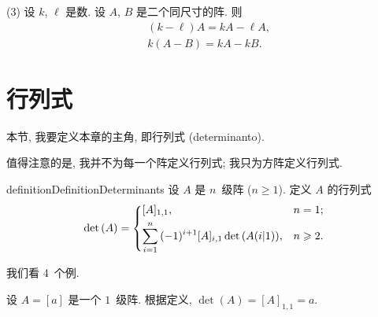 (3)
设 \(k\), \(\ell\) 是数.
设 \(A\), \(B\) 是二个同尺寸的阵.
则
\begin{align*}
     & (k - \ell) A = kA - \ell A, \\
     & k(A - B) = kA - kB.
\end{align*}

\section{行列式}

本节, 我要定义本章的主角, 即行列式
(determinanto).

值得注意的是, 我并不为每一个阵定义行列式;
我只为方阵定义行列式.

\begin{restatable}[行列式]{definition}{DefinitionDeterminants}
    设 \(A\) 是 \(n\)~级阵 (\(n \geq 1\)).
    定义 \(A\) 的行列式
    \begin{align*}
        \det {(A)}
        =
        \begin{dcases}
            [A]_{1,1},
             & n = 1;    \\
            \sum_{i = 1}^{n}
            {(-1)^{i+1} [A]_{i,1} \det {(A(i|1))}},
             & n \geq 2.
        \end{dcases}
    \end{align*}
\end{restatable}

我们看 4~个例.

\begin{example}
    设 \(A = [a]\) 是一个 \(1\)~级阵.
    根据定义, \(\det {(A)} = [A]_{1,1} = a\).
\end{example}

